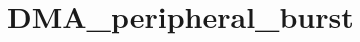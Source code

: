 \hypertarget{group___d_m_a__peripheral__burst}{\section{D\-M\-A\-\_\-peripheral\-\_\-burst}
\label{group___d_m_a__peripheral__burst}
}
